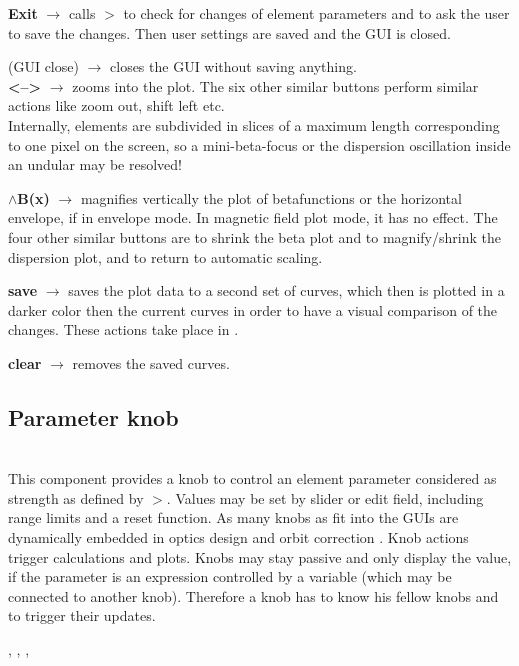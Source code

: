 \documentclass[12pt]{article}
\newcommand\code[1]{{\tt #1}}
\newcommand{\ofld}[1]{\colorbox{black!15}{{\bf #1}}}
\newcommand{\ofldx}[1]{\colorbox{black!15}{(#1)}}
\newcommand\guico[1]{{\color{blue}\code{#1}}}
\newcommand{\unico}[1]{{\color{burntorange}\code{#1}}}
\newcommand{\evcod}[2]{\ofld{#1} $\rightarrow$ \guico{#2}}
\newcommand{\evcodx}[2]{\ofldx{#1} $\rightarrow$ \guico{#2}}
\newcommand{\prcod}[2]{\opauni{#1}$>$\unico{#2}}
\newcommand{\opagui}[1]{\colorbox{blue!20}{{\color{black}\code{#1}}}}
\newcommand{\ogui}[1]{\hyperref[#1]{\opagui{#1}}}
\newcommand{\opaguif}[1]{\colorbox{violet!30}{{\color{black}\code{#1}}}}
\newcommand{\oguifh}[2]{\subsection{\label{#2}#1}{\Huge\opaguif{#2}}\\}
\newcommand{\opauni}[1]{\colorbox{orange!30}{{\color{black}\code{#1}}}}
\newcommand{\ouni}[1]{\hyperref[#1]{\opauni{#1}}}
\newcommand{\uses}[1]{\flushleft {\bf Uses:} #1}
\newcommand{\desc}[1]{#1}
\newcommand{\feature}[1]{{\color{cadmiumgreen} #1}}
\begin{document}
{\evcod{Exit}{butexitClick} calls \prcod{globlib}{EllaSave} to check for changes of element parameters and to ask the user to save the changes. Then user settings are saved and the GUI is closed.

\evcodx{GUI close}{FormClose} closes the GUI without saving anything.\\

\evcod{\textless--\textgreater}{buzoominClick} zooms into the plot. The six other similar buttons perform similar actions like zoom out, shift left etc.\\ \feature{Internally, elements are subdivided in slices of a maximum length corresponding to one pixel on the screen, so a mini-beta-focus or the dispersion oscillation inside an undular may be resolved!}

\evcod{$\wedge$B(x)}{buyupClick} magnifies vertically the plot of betafunctions or the horizontal envelope, if in envelope mode. In magnetic field plot mode, it has no effect. The four other similar buttons are to shrink the beta plot and to magnify/shrink  the dispersion plot, and to return to automatic scaling.

\evcod{save}{bucsaveClick} saves the plot data to a second set of curves, which then is plotted in a darker color then the current curves in order to have a visual comparison of the changes. These actions take place in \ouni{linoplib}.

\evcod{clear}{bucclearClick} removes the saved curves.

}




\oguifh{Parameter knob}{knobframe} 

\desc{This component provides a knob to control an element parameter considered as strength as defined by \prcod{OPAgloal}{putkval/getkval}. Values may be set by slider or edit field, including range limits and a reset function. As many knobs as fit into the GUIs are dynamically embedded in optics design \ogui{opalinop} and orbit correction \ogui{opaorbit}. Knob actions trigger calculations and plots. Knobs may stay passive and only display the value, if the parameter is an expression controlled by a variable (which may be connected to another knob). Therefore a knob has to know his fellow knobs and to trigger their updates.}

\uses{\ouni{linoplib}, \ouni{globlib}, \ouni{mathlib}, \ouni{../com/asaux}} 
 
\end{document}
